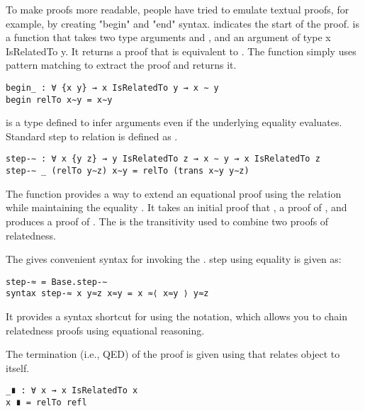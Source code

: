 To make proofs more readable, people have tried to emulate textual proofs, for
example, by creating "begin" and "end" syntax.  indicates the
start of the proof.  is a function that takes two type arguments
 and , and an argument of type x IsRelatedTo y. It returns a
proof that  is equivalent  to . The function
simply uses pattern matching to extract the proof  and returns it.

\begin{verbatim}
begin_ : ∀ {x y} → x IsRelatedTo y → x ∼ y
begin relTo x∼y = x∼y
\end{verbatim}

 is a type defined to infer arguments even if the underlying equality
evaluates. Standard step to relation is defined as .

\begin{verbatim}
step-∼ : ∀ x {y z} → y IsRelatedTo z → x ∼ y → x IsRelatedTo z
step-∼ _ (relTo y∼z) x∼y = relTo (trans x∼y y∼z)
\end{verbatim}

The  function provides a way to extend an equational proof using
the relation  while maintaining the equality .
It takes an initial proof that , a proof  of
, and produces a proof of . The
 is the transitivity used to combine two proofs of relatedness.

The  gives convenient syntax for invoking the .
step using equality is given as:

\begin{verbatim}
step-≈ = Base.step-∼
syntax step-≈ x y≈z x≈y = x ≈⟨ x≈y ⟩ y≈z
\end{verbatim}

It provides a syntax shortcut for using the  notation, which allows
you to chain relatedness proofs using equational reasoning.

The termination (i.e., QED) of the proof is given using  that relates
object to itself.

\begin{verbatim}
_∎ : ∀ x → x IsRelatedTo x
x ∎ = relTo refl
\end{verbatim}


